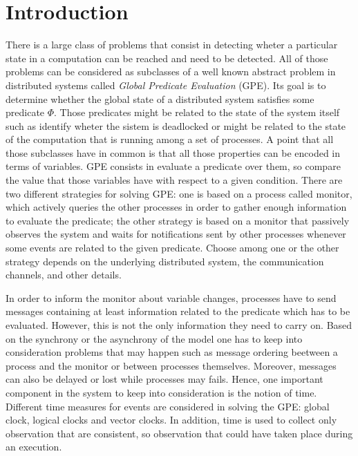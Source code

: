 \documentclass[10pt]{article}
\begin{document}


\vspace{3cm}

\section{Introduction}

There is a large class of problems that consist in detecting wheter a particular state in a computation can be reached and need to be detected.
All of those problems can be considered as subclasses of a well known abstract problem in distributed systems called \textit{Global Predicate Evaluation} (GPE). Its goal is to determine whether the global state of a distributed system satisfies some predicate $\Phi$. Those predicates might be related to the state of the system itself such as identify wheter the sistem is deadlocked or might be related to the state of the computation that is running among a set of processes. A point that all those subclasses have in common is that all those properties can be encoded in terms of variables. GPE consists in evaluate a predicate over them, so compare the value that those variables have with respect to a given condition. There are two different strategies for solving GPE: one is based on a process called monitor, which actively queries the other processes in order to gather enough information to evaluate the predicate; the other strategy is based on a monitor that passively observes the system and waits for notifications sent by other processes whenever some events are related to the given predicate. Choose among one or the other strategy depends on the underlying distributed system, the communication channels, and other details.

In order to inform the monitor about variable changes, processes have to send messages containing at least information related to the predicate which has to be evaluated. However, this is not the only information they need to carry on. Based on the synchrony or the asynchrony of the model one has to keep into consideration problems that may happen such as message ordering beetween a process and the monitor or between processes themselves. Moreover, messages can also be delayed or lost while processes may fails. Hence, one important component in the system to keep into consideration is the notion of time. Different time measures for events are considered in solving the GPE: global clock, logical clocks and vector clocks. In addition, time is used to collect only observation that are consistent, so observation that could have taken place during an execution.
\end{document}
